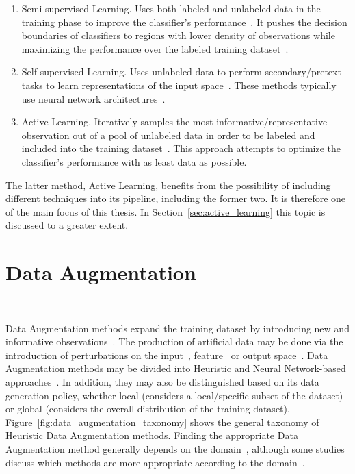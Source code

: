 \begin{enumerate}
    \item Semi-supervised Learning. Uses both labeled and unlabeled data in
        the training phase to improve the classifier's
        performance~\cite{ouali2020overview}. It pushes the decision
        boundaries of classifiers to regions with lower density of
        observations while maximizing the performance over the labeled
        training dataset~\cite{chapelle2009semi}.
    \item Self-supervised Learning. Uses unlabeled data to perform
        secondary/pretext tasks to learn representations of the input
        space~\cite{grill2020bootstrap}. These methods typically use neural
        network architectures~\cite{liu2021self}.
    \item Active Learning. Iteratively samples the most
        informative/representative observation out of a pool of unlabeled data
        in order to be labeled and included into the training
        dataset~\cite{budd2021survey}. This approach attempts to optimize the
        classifier's performance with as least data as possible.
\end{enumerate}

The latter method, Active Learning, benefits from the possibility of including
different techniques into its pipeline, including the former two. It is
therefore one of the main focus of this thesis. In
Section~\ref{sec:active_learning} this topic is discussed to a greater extent.

\section{Data Augmentation}~\label{sec:data_augmentation}

Data Augmentation methods expand the training dataset by introducing new and
informative observations~\cite{Behpour2019}. The production of artificial data
may be done via the introduction of perturbations on the
input~\cite{Zhong2020}, feature~\cite{DeVries2017} or output
space~\cite{Behpour2019}. Data Augmentation methods may be divided into
Heuristic and Neural Network-based approaches~\cite{Shorten2019}. In addition,
they may also be distinguished based on its data generation policy, whether
local (considers a local/specific subset of the dataset) or global (considers
the overall distribution of the training dataset).
Figure~\ref{fig:data_augmentation_taxonomy} shows the general taxonomy of
Heuristic Data Augmentation methods. Finding the appropriate Data Augmentation
method generally depends on the domain~\cite{DeVries2017}, although some
studies discuss which methods are more appropriate according to the
domain~\cite{Shorten2019, Iwana2021, Wong2016}.

